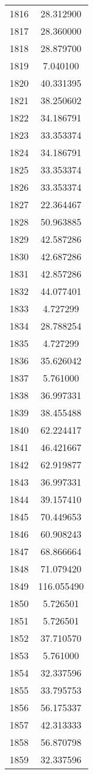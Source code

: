 \documentclass[12pt]{article}
\begin{document}
\begin{longtable}{@{}cc@{}}
1816 & 28.312900 \\
1817 & 28.360000 \\
1818 & 28.879700 \\
1819 & 7.040100 \\
1820 & 40.331395 \\
1821 & 38.250602 \\
1822 & 34.186791 \\
1823 & 33.353374 \\
1824 & 34.186791 \\
1825 & 33.353374 \\
1826 & 33.353374 \\
1827 & 22.364467 \\
1828 & 50.963885 \\
1829 & 42.587286 \\
1830 & 42.687286 \\
1831 & 42.857286 \\
1832 & 44.077401 \\
1833 & 4.727299 \\
1834 & 28.788254 \\
1835 & 4.727299 \\
1836 & 35.626042 \\
1837 & 5.761000 \\
1838 & 36.997331 \\
1839 & 38.455488 \\
1840 & 62.224417 \\
1841 & 46.421667 \\
1842 & 62.919877 \\
1843 & 36.997331 \\
1844 & 39.157410 \\
1845 & 70.449653 \\
1846 & 60.908243 \\
1847 & 68.866664 \\
1848 & 71.079420 \\
1849 & 116.055490 \\
1850 & 5.726501 \\
1851 & 5.726501 \\
1852 & 37.710570 \\
1853 & 5.761000 \\
1854 & 32.337596 \\
1855 & 33.795753 \\
1856 & 56.175337 \\
1857 & 42.313333 \\
1858 & 56.870798 \\
1859 & 32.337596 \\

\end{longtable}
\end{document}

